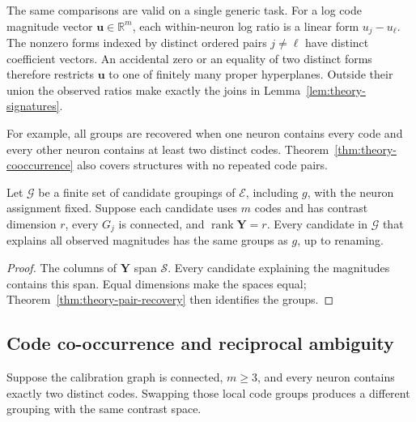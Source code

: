 The same comparisons are valid on a single generic task.
For a log code magnitude vector $\mathbf u\in\mathbb R^m$, each
within-neuron log ratio is a linear form $u_j-u_\ell$.
The nonzero forms indexed by distinct ordered pairs $j\ne\ell$
have distinct coefficient vectors. An accidental zero or an equality
of two distinct forms therefore restricts $\mathbf u$ to one of
finitely many proper hyperplanes. Outside their union the observed
ratios make exactly the joins in Lemma~\ref{lem:theory-signatures}.

For example, all groups are recovered when one neuron contains
every code and every other neuron contains at least two distinct codes.
Theorem~\ref{thm:theory-cooccurrence} also covers structures with
no repeated code pairs.

\begin{corollary}
    \label{cor:theory-task-diversity}
    Let $\mathcal G$ be a finite set of candidate groupings of
    $\mathcal E$, including $g$, with the neuron assignment fixed.
    Suppose each candidate uses $m$ codes and has contrast dimension
    $r$, every $G_j$ is connected, and
    $\operatorname{rank}\mathbf Y=r$.
    Every candidate in $\mathcal G$ that explains all observed
    magnitudes has the same groups as $g$, up to renaming.
\end{corollary}

\begin{proof}
    The columns of $\mathbf Y$ span $\mathcal S$.
    Every candidate explaining the magnitudes contains this span.
    Equal dimensions
    make the spaces equal; Theorem~\ref{thm:theory-pair-recovery}
    then identifies the groups.
\end{proof}

\subsection{Code co-occurrence and reciprocal ambiguity}
\label{app:theory-cooccurrence}

\begin{lemma}
    \label{lem:theory-reciprocal}
    Suppose the calibration graph is connected, $m\ge3$, and
    every neuron contains exactly two distinct codes.
    Swapping those local code groups produces a different
    grouping with the same contrast space.
\end{lemma}

